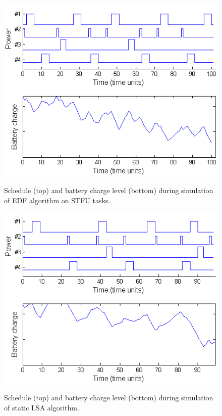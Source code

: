 \begin{figure}[tb]
\begin{center}
\includegraphics[scale=0.57]{edfstfubattery.png}
\label{fig:edfstfubattery}
\caption{Schedule (top) and battery charge level (bottom) during simulation of EDF algorithm on STFU tasks.}
\end{center}
\end{figure}

\begin{figure}[tb]
\begin{center}
\includegraphics[scale=0.57]{lsabattery.png}
\label{fig:lsabattery}
\caption{Schedule (top) and battery charge level (bottom) during simulation of static LSA algorithm.}
\end{center}
\end{figure}

